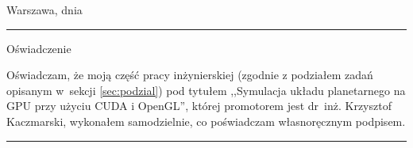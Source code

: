 \thispagestyle{empty}

\mbox{}
\vspace{0.15\paperheight}

Warszawa, dnia \rule{4cm}{0.5pt}

\vspace{2em}

\begin{center}
{\large Oświadczenie}
\end{center}

\vspace{1em}

Oświadczam, że moją część pracy inżynierskiej (zgodnie z podziałem zadań opisanym w~sekcji \ref{sec:podzial}) pod tytułem ,,Symulacja układu planetarnego na GPU przy użyciu CUDA i OpenGL'', której promotorem jest dr~inż. Krzysztof Kaczmarski, wykonałem samodzielnie, co poświadczam własnoręcznym podpisem.

\vspace{3em}

\hfill\rule{5cm}{0.5pt}

